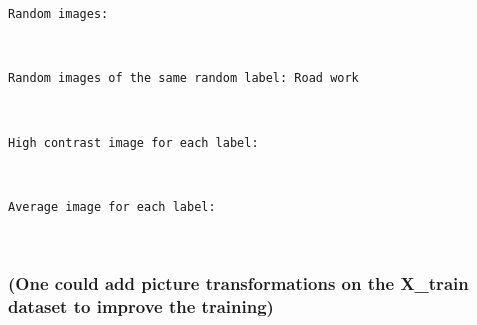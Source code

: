 \documentclass[11pt]{article}
\begin{document}
    \begin{Verbatim}[commandchars=\\\{\}]
Random images:

    \end{Verbatim}

    \begin{center}
    \end{center}
    { \hspace*{\fill} \\}
    
    \begin{Verbatim}[commandchars=\\\{\}]
Random images of the same random label: Road work

    \end{Verbatim}

    \begin{center}
    \end{center}
    { \hspace*{\fill} \\}
    
    \begin{Verbatim}[commandchars=\\\{\}]
High contrast image for each label:

    \end{Verbatim}

    \begin{center}
    \end{center}
    { \hspace*{\fill} \\}
    
    \begin{Verbatim}[commandchars=\\\{\}]
Average image for each label:

    \end{Verbatim}

    \begin{center}
    \end{center}
    { \hspace*{\fill} \\}
    
    \subsubsection{(One could add picture transformations on the X\_train
dataset to improve the
training)}\label{one-could-add-picture-transformations-on-the-x_train-dataset-to-improve-the-training}
\end{document}
